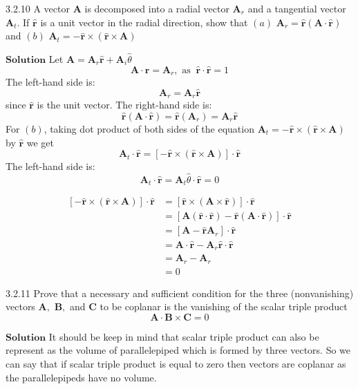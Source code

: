 \documentclass{styles/kaobook}
\begin{document}
\begin{greenbox}{3.2.10}
A vector $\mathbf{A}$ is decomposed into a radial vector $\mathbf{A}_{r}$ and a tangential vector $\mathbf{A}_{t} .$ If $\hat{\mathbf{r}}$ is a unit vector in the radial direction, show that
$(a)$ $\mathbf{A}_{r}=\hat{\mathbf{r}}(\mathbf{A} \cdot \hat{\mathbf{r}})$ and
$(b)$ $\mathbf{A}_{t}=-\hat{\mathbf{r}} \times(\hat{\mathbf{r}} \times \mathbf{A})$
\end{greenbox}


$\boxed{\textbf{Solution}}$ Let $\mathbf{A}=\mathbf{A}_{r} \hat{\mathbf{r}}+\mathbf{A}_{i} \hat{\theta}$
$$
\mathbf{A} \cdot \hat{\mathbf{r}}=\mathbf{A}_{r}, \text { as } \ \hat{\mathbf{r}} \cdot \hat{\mathbf{r}}=1
$$
The left-hand side is:
$$\mathbf{A}_{r}=\mathbf{A}_{r} \hat{\mathbf{r}}$$ since $\hat{\mathbf{r}}$ is the unit vector.
The right-hand side is:
$$
\hat{\mathbf{r}}(\mathbf{A} \cdot \hat{\mathbf{r}})=\hat{\mathbf{r}}\left(\mathbf{A}_{r}\right)=\mathbf{A}_{r} \hat{\mathbf{r}}
$$
For $(b)$, taking dot product of both sides of the equation $\mathbf{A}_{t}=-\hat{\mathbf{r}} \times(\hat{\mathbf{r}} \times \mathbf{A})$ by $\hat{\mathbf{r}}$ we get
$$
\mathbf{A}_{t} \cdot \hat{\mathbf{r}}=[-\hat{\mathbf{r}} \times(\hat{\mathbf{r}} \times \mathbf{A})] \cdot \hat{\mathbf{r}}
$$
The left-hand side is:
$$
\mathbf{A}_{t} \cdot \hat{\mathbf{r}}=\mathbf{A}_{t} \hat{\theta} \cdot \hat{\mathbf{r}}=0
$$

$$
\begin{aligned}
[-\hat{\mathbf{r}} \times(\hat{\mathbf{r}} \times \mathbf{A})] \cdot \hat{\mathbf{r}}&=[\hat{\mathbf{r}} \times(\mathbf{A} \times \hat{\mathbf{r}})] \cdot \hat{\mathbf{r}} \\
&=[\mathbf{A}(\hat{\mathbf{r}} \cdot \hat{\mathbf{r}})-\hat{\mathbf{r}}(\mathbf{A} \cdot \hat{\mathbf{r}})] \cdot \hat{\mathbf{r}} \\
&=\left[\mathbf{A}-\hat{\mathbf{r}} \mathbf{A}_{r}\right] \cdot \hat{\mathbf{r}} \\
&=\mathbf{A} \cdot \hat{\mathbf{r}}-\mathbf{A}_{r} \hat{\mathbf{r}} \cdot \hat{\mathbf{r}} \\
&=\mathbf{A}_{r}-\mathbf{A}_{r}\\
&=0
\end{aligned}
$$

\begin{greenbox}{3.2.11}
Prove that a necessary and sufficient condition for the three (nonvanishing) vectors $\mathbf{A},$ $\mathbf{B},$ and $\mathbf{C}$ to be coplanar is the vanishing of the scalar triple product
$$
\mathbf{A} \cdot \mathbf{B} \times \mathbf{C}=0
$$
\end{greenbox}
$\boxed{\textbf{Solution}}$ It should be keep in mind that scalar triple product can also be represent as the volume of
parallelepiped which is formed by three vectors. So we can say that if scalar triple product is equal to zero then vectors are coplanar as the parallelepipeds have no volume.
\end{document}
